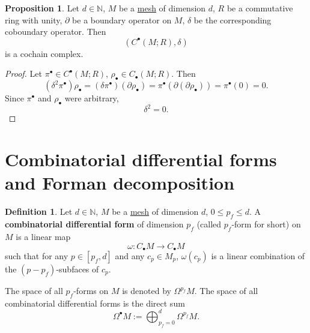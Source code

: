 \documentclass[fleqn]{article}
\theoremstyle{definition}
\newtheorem{proposition}[theorem]{Proposition}
\newtheorem{definition}[theorem]{Definition}
\newcommand{\N}{\mathbb{N}}
\begin{document}
\begin{proposition}
  Let
    $d \in \N$,
    $M$ be a \hyperref[idec:mesh:definition]{mesh} of dimension $d$,
    $R$ be a commutative ring with unity,
    $\partial$ be a boundary operator on $M$,
    $\delta$ be the corresponding coboundary operator.
  Then
  \begin{equation}
    (C^\bullet(M; R), \delta)
  \end{equation}
  is a cochain complex.
\end{proposition}

\begin{proof}
  Let $\pi^\bullet \in C^\bullet(M; R)$, $\rho_\bullet \in C_\bullet(M; R)$.
  Then
  \begin{equation}
    (\delta^2 \pi^\bullet) \rho_\bullet
    = (\delta \pi^\bullet) (\partial \rho_\bullet)
    = \pi^\bullet (\partial (\partial \rho_\bullet))
    = \pi^\bullet (0)
    = 0.
  \end{equation}
  Since $\pi^\bullet$ and $\rho_\bullet$ were arbitrary,
  \begin{equation}
    \delta^2 = 0.
  \end{equation}
\end{proof}

\section{Combinatorial differential forms and Forman decomposition}

\begin{definition}
  Let
    $d \in \N$,
    $M$ be a \hyperref[idec:mesh:definition]{mesh} of dimension $d$,
    $0 \leq p_f \leq d$.
  A \textbf{combinatorial differential form} of dimension $p_f$
  (called $p_f$-form for short) on $M$ is a linear map
  \begin{equation}
    \omega \colon C_\bullet M \to C_\bullet M
  \end{equation}
  such that for any $p \in [p_f, d]$ and any $c_p \in M_p$,
  $\omega(c_p)$ is a linear combination of the $(p - p_f)$-subfaces of $c_p$.

  The space of all $p_f$-forms on $M$ is denoted by $\Omega^{p_f} M$.
  The space of all combinatorial differential forms is the direct sum
  \begin{equation}
    \Omega^\bullet M := \bigoplus_{p_f = 0}^{d} \Omega^{p_f} M.
  \end{equation}
\end{definition}
\end{document}
